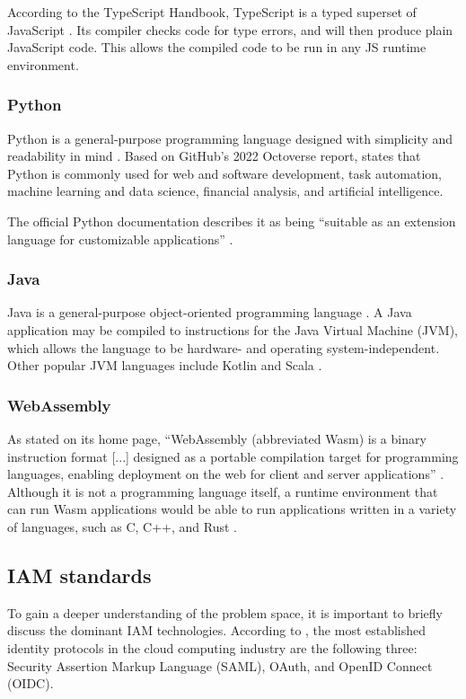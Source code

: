 According to the TypeScript Handbook, TypeScript is a typed superset of JavaScript \autocite{TypeScript2023}. Its compiler checks code for type errors, and will then produce plain JavaScript code. This allows the compiled code to be run in any JS runtime environment.

\subsubsection{Python}
Python is a general-purpose programming language designed with simplicity and readability in mind \autocite{Peters2004}. Based on GitHub's 2022 Octoverse report, \textcite{Scarlett2023} states that Python is commonly used for web and software development, task automation, machine learning and data science, financial analysis, and artificial intelligence.

The official Python documentation describes it as being ``suitable as an extension language for customizable applications'' \autocite{PSF2023}.

\subsubsection{Java}
Java is a general-purpose object-oriented programming language \autocite{Lindholm2015}. A Java application may be compiled to instructions for the Java Virtual Machine (JVM), which allows the language to be hardware- and operating system-independent. Other popular JVM languages include Kotlin and Scala \autocite{StackOverflow2023, JetBrains2023}.

\subsubsection{WebAssembly}
As stated on its home page, ``WebAssembly (abbreviated Wasm) is a binary instruction format [...] designed as a portable compilation target for programming languages, enabling deployment on the web for client and server applications'' \autocite{WebAssembly}. Although it is not a programming language itself, a runtime environment that can run Wasm applications would be able to run applications written in a variety of languages, such as C, C++, and Rust \autocite{EmscriptenContributors2015, RWWG2023}.

\subsection{IAM standards}
To gain a deeper understanding of the problem space, it is important to briefly discuss the dominant IAM technologies. According to \textcite{Naik2016}, the most established identity protocols in the cloud computing industry are the following three: Security Assertion Markup Language (SAML), OAuth, and OpenID Connect (OIDC). 

